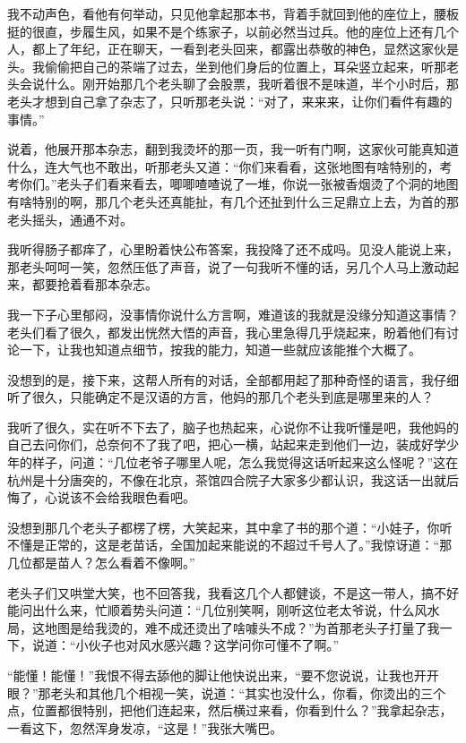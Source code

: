 我不动声色，看他有何举动，只见他拿起那本书，背着手就回到他的座位上，腰板挺的很直，步履生风，如果不是个练家子，以前必然当过兵。他的座位上还有几个人，都上了年纪，正在聊天，一看到老头回来，都露出恭敬的神色，显然这家伙是头。我偷偷把自己的茶端了过去，坐到他们身后的位置上，耳朵竖立起来，听那老头会说什么。刚开始那几个老头聊了会股票，我听着很不是味道，半个小时后，那老头才想到自己拿了杂志了，只听那老头说：“对了，来来来，让你们看件有趣的事情。”

说着，他展开那本杂志，翻到我烫坏的那一页，我一听有门啊，这家伙可能真知道什么，连大气也不敢出，听那老头又道：“你们来看看，这张地图有啥特别的，考考你们。”老头子们看来看去，唧唧喳喳说了一堆，你说一张被香烟烫了个洞的地图有啥特别的啊，那几个老头还真能扯，有几个还扯到什么三足鼎立上去，为首的那老头摇头，通通不对。

我听得肠子都痒了，心里盼着快公布答案，我投降了还不成吗。见没人能说上来，那老头呵呵一笑，忽然压低了声音，说了一句我听不懂的话，另几个人马上激动起来，都要抢着看那本杂志。

我一下子心里郁闷，没事情你说什么方言啊，难道该的我就是没缘分知道这事情？老头们看了很久，都发出恍然大悟的声音，我心里急得几乎烧起来，盼着他们有讨论一下，让我也知道点细节，按我的能力，知道一些就应该能推个大概了。

没想到的是，接下来，这帮人所有的对话，全部都用起了那种奇怪的语言，我仔细听了很久，只能确定不是汉语的方言，他妈的那几个老头到底是哪里来的人？

我听了很久，实在听不下去了，脑子也热起来，心说你不让我听懂是吧，我他妈的自己去问你们，总奈何不了我了吧，把心一横，站起来走到他们一边，装成好学少年的样子，问道：“几位老爷子哪里人呢，怎么我觉得这话听起来这么怪呢？”这在杭州是十分唐突的，不像在北京，茶馆四合院子大家多少都认识，我这话一出就后悔了，心说该不会给我眼色看吧。

没想到那几个老头子都楞了楞，大笑起来，其中拿了书的那个道：“小娃子，你听不懂是正常的，这是老苗话，全国加起来能说的不超过千号人了。”我惊讶道：“那几位都是苗人？怎么看着不像啊。”

老头子们又哄堂大笑，也不回答我，我看这几个人都健谈，不是这一带人，搞不好能问出什么来，忙顺着势头问道：“几位别笑啊，刚听这位老太爷说，什么风水局，这地图是给我烫的，难不成还烫出了啥噱头不成？”为首那老头子打量了我一下，说道：“小伙子也对风水感兴趣？这学问你可懂不了啊。”

“能懂！能懂！”我恨不得去舔他的脚让他快说出来，“要不您说说，让我也开开眼？”那老头和其他几个相视一笑，说道：“其实也没什么，你看，你烫出的三个点，位置都很特别，把他们连起来，然后横过来看，你看到什么？”我拿起杂志，一看这下，忽然浑身发凉，“这是！”我张大嘴巴。

